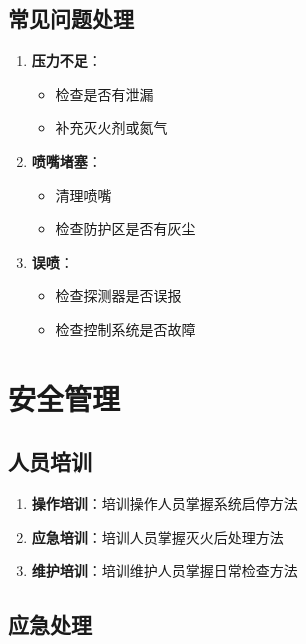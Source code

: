 \documentclass[12pt,UTF8]{ctexbook}
\begin{document}
\section{常见问题处理}

\begin{enumerate}
    \item \textbf{压力不足}：
    \begin{itemize}[leftmargin=2em]
        \item 检查是否有泄漏
        \item 补充灭火剂或氮气
    \end{itemize}
    
    \item \textbf{喷嘴堵塞}：
    \begin{itemize}[leftmargin=2em]
        \item 清理喷嘴
        \item 检查防护区是否有灰尘
    \end{itemize}
    
    \item \textbf{误喷}：
    \begin{itemize}[leftmargin=2em]
        \item 检查探测器是否误报
        \item 检查控制系统是否故障
    \end{itemize}
\end{enumerate}

\chapter{安全管理}

\section{人员培训}

\begin{enumerate}
    \item \textbf{操作培训}：培训操作人员掌握系统启停方法
    \item \textbf{应急培训}：培训人员掌握灭火后处理方法
    \item \textbf{维护培训}：培训维护人员掌握日常检查方法
\end{enumerate}

\section{应急处理}
\end{document}
